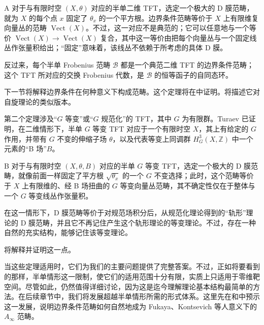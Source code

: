\begin{lettertheorem}{A}\label{thm:2.A}
对于与有限时空 $(X,\theta)$ 对应的半单二维 TFT，选定一个极大的 D 膜范畴，就为 $X$ 的每个点 $x$ 固定了 $\theta_x$ 的一个平方根。边界条件范畴等价于 $X$ 上有限维复向量丛的范畴 $\operatorname{Vect}(X)$。不过，这一对应不是典范的；它可以任意地与一个等价 $\operatorname{Vect}(X)\to\operatorname{Vect}(X)$ 复合，其中这一等价由把每个向量丛与一个固定线丛作张量积给出；“固定”意味着，该线丛不依赖于所考虑的具体 D 膜。

反过来，每个半单 Frobenius 范畴 $\mathcal{B}$ 都是一个典范二维 TFT 的边界条件范畴；这个 TFT 所对应的交换 Frobenius 代数，是 $\mathcal{B}$ 的恒等函子的自同态环。
\end{lettertheorem}

下一节将解释边界条件在何种意义下构成范畴。这个定理将在中证明。将描述它对自旋理论的类似版本。

第二个定理涉及“$G$ 等变”或“$G$ 规范化”的 TFT，其中 $G$ 为有限群。Turaev 已证明，在二维情形下，半单 $G$ 等变 TFT 对应于一个有限时空 $X$，其上有给定的 $G$ 作用，并带有 $G$ 不变的伸缩子场 $\theta$，以及代表等变上同调群 $H_G^3(X,\mathbb{Z})$ 中一个元素的“B 场”$B$。

\begin{lettertheorem}{B}\label{thm:2.B}
对于与有限时空 $(X,\theta,B)$ 对应的半单 $G$ 等变 TFT，选定一个极大的 D 膜范畴，就像前面一样固定了平方根 $\sqrt{\theta_x}$ 的一个 $G$ 不变选择；此时，这个范畴等价于 $X$ 上有限维的、经 B 场扭曲的 $G$ 等变向量丛范畴，其不确定性仅在于整体与一个 $G$ 等变线丛作张量积。

在这一情形下，D 膜范畴等价于对规范场积分后，从规范化理论得到的“轨形”理论的 D 膜范畴，并且它不再记住产生这个轨形理论的等变理论。不过，存在一种自然的充实结构，能够记住该等变理论。
\end{lettertheorem}

将解释并证明这一点。

当这些定理适用时，它们为我们的主要问题提供了完整答案。不过，正如将要看到的那样，半单情形这一限制，使它们的适用范围十分有限，实质上只适用于零维靶空间。尽管如此，仍然值得详细讨论，因为这是迄今理解理论基本结构最简单的方法。在后续章节中，我们将发展超越半单情形所需的形式体系。这里先在和中预示这一发展，说明边界条件范畴如何自然地成为 Fukaya、Kontsevich 等人意义下的 $A_\infty$ 范畴。

